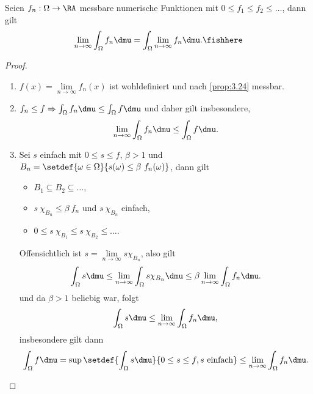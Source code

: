\begin{prop}
\label{prop:3.32}
Seien $f_n: \Omega\to\RA$ messbare numerische Funktionen mit $0\le f_1\le f_2\le
\ldots$, dann gilt
\begin{align*}
\lim\limits_{n\to\infty} \int_\Omega f_n \dmu = \int_\Omega
\lim\limits_{n\to\infty} f_n \dmu.\fishhere
\end{align*}
\end{prop}
\begin{proof}
\begin{enumerate}[label=\arabic{*}.)]
  \item $f(x) = \lim\limits_{n\to\infty} f_n(x)$ ist wohldefiniert und nach
  \ref{prop:3.24} messbar.
  \item $f_n\le f \Rightarrow \int_\Omega f_n \dmu\le \int_\Omega f\dmu$ und
  daher gilt insbesondere,
  \begin{align*}
  \lim\limits_{n\to\infty}  \int_\Omega f_n \dmu\le
  \int_\Omega f\dmu.
  \end{align*}
  \item Sei $s$ einfach mit $0\le s\le f$, $\beta > 1$ und $B_n =
  \setdef{\omega\in\Omega}{s(\omega) \le \beta\ f_n(\omega)}$, dann gilt
  \begin{itemize}
    \item $B_1\subseteq B_2\subseteq \ldots$,
    \item $s\ \chi_{B_n} \le \beta\ f_n$ und $s\ \chi_{B_n}$ einfach,
    \item $0\le s\ \chi_{B_1} \le s\ \chi_{B_2} \le \ldots$.
  \end{itemize}
  Offensichtlich ist $s = \lim\limits_{n\to\infty} s\chi_{B_n}$, also gilt
\begin{align*}
\int_\Omega s\dmu \le \lim\limits_{n\to\infty} \int_\Omega s\chi_{B_n}\dmu
\le \beta \lim\limits_{n\to\infty} \int_\Omega f_n\dmu.
\end{align*}
und da $\beta > 1$ beliebig war, folgt
\begin{align*}
\int_\Omega s\dmu \le \lim\limits_{n\to\infty} \int_\Omega f_n\dmu,
\end{align*}
insbesondere gilt dann
\begin{align*}
\int_\Omega f\dmu = \sup \setdef{\int_\Omega s\dmu}{0\le s\le f, s \text{
einfach}} \le \lim\limits_{n\to\infty} \int_\Omega f_n\dmu.\qedhere
\end{align*}
\end{enumerate}
\end{proof}

